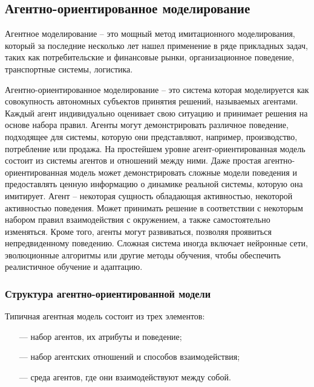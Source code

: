 \subsection{Агентно-ориентированное моделирование}

Агентное моделирование – это мощный метод имитационного моделирования, который за последние несколько лет нашел применение в ряде прикладных задач, таких как потребительские и финансовые рынки, организационное поведение, транспортные системы, логистика.

Агентно-ориентированное моделирование – это система которая моделируется как совокупность автономных субъектов принятия решений, называемых агентами.
Каждый агент индивидуально оценивает свою ситуацию и принимает решения на основе набора правил. Агенты могут демонстрировать различное поведение,
подходящее для системы, которую они представляют, например, производство, потребление или продажа. На простейшем уровне агент-ориентированная модель состоит из системы агентов и отношений между ними. Даже простая агентно-ориентированная модель может демонстрировать сложные модели поведения и предоставлять ценную информацию о динамике реальной системы, которую она имитирует. 
Агент – некоторая сущность обладающая активностью, некоторой активностью поведения. Может принимать решение в соответствии с некоторым набором правил взаимодействия с окружением, а также самостоятельно изменяться. Кроме того, агенты могут развиваться, позволяя проявиться непредвиденному поведению. Сложная система иногда включает нейронные сети, эволюционные алгоритмы или другие методы обучения, чтобы обеспечить реалистичное обучение и адаптацию.

\subsubsection{Структура агентно-ориентированной модели}

Типичная агентная модель состоит из трех элементов:

\begin{itemize}[leftmargin=1.6\parindent]
	\item[---] набор агентов, их атрибуты и поведение;
	\item[---] набор агентских отношений и способов взаимодействия;
	\item[---] среда агентов, где они взаимодействуют между собой.

\end{itemize}

